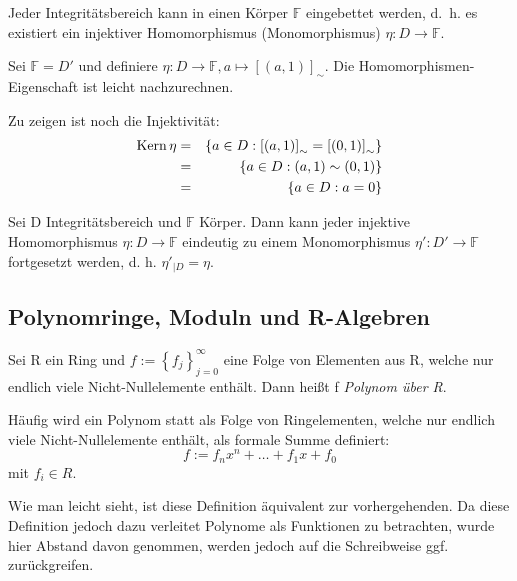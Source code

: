 \documentclass[10pt]{scrbook}
\begin{document}
\begin{Kor}
Jeder Integritätsbereich kann in einen Körper $\mathbb{F}$ eingebettet werden, d.~h. es existiert ein injektiver Homomorphismus (Monomorphismus) $\eta: D\rightarrow \mathbb{F}$.
\end{Kor}
\begin{bew}
Sei $\mathbb{F}=D'$ und definiere $\eta: D\rightarrow \mathbb{F}, a\mapsto \left[(a, 1)\right]_\sim$. Die Homomorphismen-Eigenschaft ist leicht nachzurechnen.

Zu zeigen ist noch die Injektivität:
\begin{eqnarray*}
	\operatorname{Kern} \eta & = & \left\{a\in D: \left[(a, 1)\right]_\sim=\left[(0, 1)\right]_\sim \right\} \\
	& = & \left\{a\in D: (a, 1)\sim (0, 1) \right\} \\
	& = & \left\{a\in D: a=0 \right\} \\
\end{eqnarray*}
\end{bew}

\begin{Sa}
Sei D Integritätsbereich und $\mathbb{F}$ Körper. Dann kann jeder injektive Homomorphismus $\eta: D\rightarrow \mathbb{F}$ eindeutig zu einem Monomorphismus $\eta': D'\rightarrow \mathbb{F}$ fortgesetzt werden, d. h. $\eta'_{|D}=\eta$.
\end{Sa}

\subsection{Polynomringe, Moduln und R-Algebren}

\begin{Def}
Sei R ein Ring und $f:=\left\{f_j\right\}_{j=0}^\infty$ eine Folge von Elementen aus R, welche nur endlich viele Nicht-Nullelemente enthält. Dann heißt f \emph{Polynom über R}.
\end{Def}

\begin{Bem}
Häufig wird ein Polynom statt als Folge von Ringelementen, welche nur endlich viele Nicht-Nullelemente enthält, als formale Summe definiert:
\begin{displaymath}
	f:=f_n x^n+\ldots+f_1 x + f_0
\end{displaymath}
mit $f_i\in R$.

Wie man leicht sieht, ist diese Definition äquivalent zur vorhergehenden. Da diese Definition jedoch dazu verleitet Polynome als Funktionen zu betrachten, wurde hier Abstand davon genommen, werden jedoch auf die Schreibweise ggf. zurückgreifen.
\end{Bem}
\end{document}
